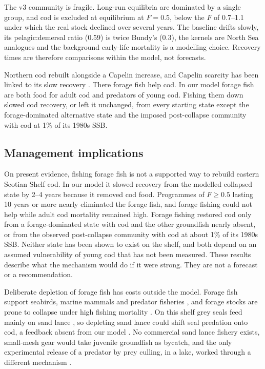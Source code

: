 \documentclass[12pt,letterpaper,fleqn]{article}
\begin{document}
The v3 community is fragile. Long-run equilibria are dominated by a single group, and cod is excluded at equilibrium at $F=0.5$, below the $F$ of 0.7--1.1 under which the real stock declined over several years. The baseline drifts slowly, its pelagic:demersal ratio (0.59) is twice Bundy's (0.3), the kernels are North Sea analogues and the background early-life mortality is a modelling choice. Recovery times are therefore comparisons within the model, not forecasts.

Northern cod rebuilt alongside a Capelin increase, and Capelin scarcity has been linked to its slow recovery \autocite{rose2015northern,koenalonso2021comparative}. There forage fish help cod. In our model forage fish are both food for adult cod and predators of young cod. Fishing them down slowed cod recovery, or left it unchanged, from every starting state except the forage-dominated alternative state and the imposed post-collapse community with cod at 1\% of its 1980s SSB.

\subsection{Management implications}

On present evidence, fishing forage fish is not a supported way to rebuild eastern Scotian Shelf cod. In our model it slowed recovery from the modelled collapsed state by 2--4 years because it removed cod food. Programmes of $F\geq0.5$ lasting 10 years or more nearly eliminated the forage fish, and forage fishing could not help while adult cod mortality remained high. Forage fishing restored cod only from a forage-dominated state with cod and the other groundfish nearly absent, or from the observed post-collapse community with cod at about 1\% of its 1980s SSB. Neither state has been shown to exist on the shelf, and both depend on an assumed vulnerability of young cod that has not been measured. These results describe what the mechanism would do if it were strong. They are not a forecast or a recommendation.

Deliberate depletion of forage fish has costs outside the model. Forage fish support seabirds, marine mammals and predator fisheries \autocite{smith2011impacts,cury2011global,pikitch2014global}, and forage stocks are prone to collapse under high fishing mortality \autocite{essington2015fishing}. On this shelf grey seals feed mainly on sand lance \autocite{bowen1994offshore}, so depleting sand lance could shift seal predation onto cod, a feedback absent from our model \autocite{swain2000pelagic,bowen2013marine}. No commercial sand lance fishery exists, small-mesh gear would take juvenile groundfish as bycatch, and the only experimental release of a predator by prey culling, in a lake, worked through a different mechanism \autocite{persson2007culling}.
\end{document}
